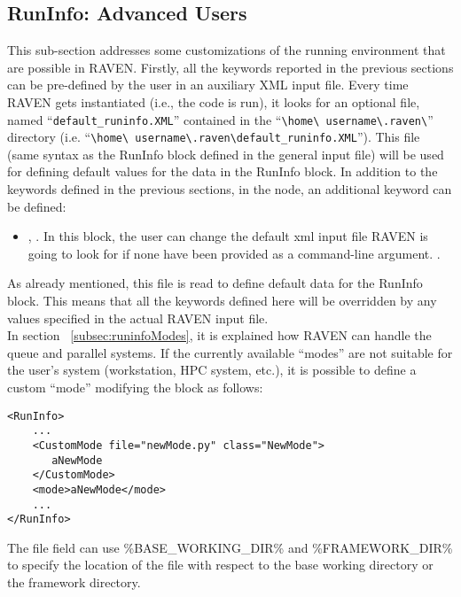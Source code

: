 \subsection{RunInfo: Advanced Users}
\label{subsec:runinfoadvanced}
This sub-section addresses some customizations of the running environment that
are possible in RAVEN.
%
Firstly, all the keywords reported in the previous sections can be pre-defined
by the user in an auxiliary XML input file.
%
Every time RAVEN gets instantiated (i.e., the code is run), it looks for an
optional file, named ``\texttt{default\_runinfo.XML}'' contained in the
``\texttt{\textbackslash home\textbackslash
username\textbackslash.raven\textbackslash}'' directory (i.e.
``\texttt{\textbackslash home\textbackslash
username\textbackslash.raven\textbackslash default\_runinfo.XML}'').
%
This file (same syntax as the RunInfo block defined in the general input file)
will be used for defining default values for the data in the RunInfo block. In
addition to the keywords defined in the previous sections, in the
 node, an additional keyword can be defined:
\begin{itemize}
\item {}, . In
this block, the user can change the default xml input file RAVEN is going to
look for if none have been provided as a command-line argument.
%
.
\end{itemize}
As already mentioned, this file is read to define default data for the RunInfo
block.
%
This means that all the keywords defined here will be overridden by any values
specified in the actual RAVEN input file.
%
\\ In section ~\ref{subsec:runinfoModes}, it is explained how RAVEN can
handle the queue and parallel systems.
%
If the currently available ``modes'' are not suitable for the user's system
(workstation, HPC system, etc.), it is possible to define a custom ``mode''
modifying the  block as follows:
\begin{lstlisting}[style=XML]
<RunInfo>
    ...
    <CustomMode file="newMode.py" class="NewMode">
       aNewMode
    </CustomMode>
    <mode>aNewMode</mode>
    ...
</RunInfo>
\end{lstlisting}

The file field can use \%BASE\_WORKING\_DIR\% and \%FRAMEWORK\_DIR\%
to specify the location of the file with respect to the base working
directory or the framework directory.

